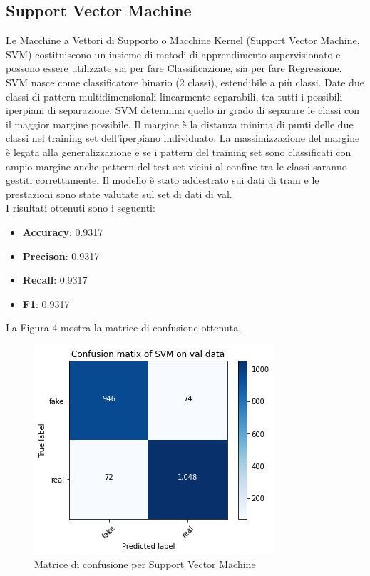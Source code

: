 \documentclass{article}
\begin{document}
\subsection{Support Vector Machine}
Le Macchine a Vettori di Supporto o Macchine Kernel (Support Vector Machine, SVM) costituiscono un insieme di metodi di apprendimento supervisionato e possono essere utilizzate sia per fare Classificazione, sia per fare Regressione. SVM nasce come classificatore binario (2 classi), estendibile a più classi.
Date due classi di pattern multidimensionali linearmente separabili, tra tutti i possibili iperpiani di separazione, SVM determina quello in grado di separare le classi con il maggior margine possibile.
Il margine è la distanza minima di punti delle due classi nel training set dell'iperpiano individuato. 
La massimizzazione del margine è legata alla generalizzazione e se i pattern del training set sono classificati con ampio margine anche pattern del test set vicini al confine tra le classi saranno gestiti correttamente.
Il modello è stato addestrato sui dati di train e le prestazioni sono state valutate sul set di dati di val. \\
I risultati ottenuti sono i seguenti:
\begin{itemize}[noitemsep]
  \item \textbf{Accuracy}: 0.9317
  \item \textbf{Precison}: 0.9317
  \item \textbf{Recall}: 0.9317
  \item \textbf{F1}: 0.9317
 \end{itemize}

\noindent
La Figura 4 mostra la matrice di confusione ottenuta.
\begin{figure}[H]
\includegraphics[width=0.5\linewidth]{SVM.png}
\centering
\caption{Matrice di confusione per Support Vector Machine}
\label{fig:bytepost}
\end{figure}
\end{document}
